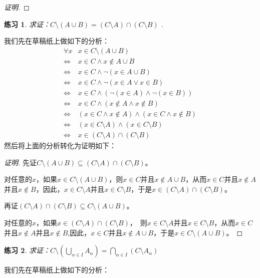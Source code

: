 \documentclass{book}[oneside]
\newtheorem{Exercise}{练习}[chapter]
\begin{document}
\begin{CJK*}{UTF8}{gbsn}
\begin{proof}[证明]
\end{proof}
\begin{Exercise}
  求证：$C\setminus (A \cup B) = (C \setminus A) \cap (C \setminus B)$ .
\end{Exercise}
我们先在草稿纸上做如下的分析：
\begin{equation*}
  \begin{split}
    \forall x &x \in C\setminus (A\cup B)\\
    \Leftrightarrow&x \in C \land x \notin A\cup B\\
    \Leftrightarrow&x \in C \land \lnot (x \in A\cup B)\\
    \Leftrightarrow&x \in C \land \lnot (x \in A \lor x \in B)\\
    \Leftrightarrow&x \in C \land (\lnot (x \in A) \land \lnot (x \in B))\\
    \Leftrightarrow&x \in C \land (x \notin A \land x \notin B)\\
    \Leftrightarrow&(x \in C \land x \notin A) \land (x \in C \land x \notin B)\\
    \Leftrightarrow&(x \in C \setminus A)\land (x \in C\setminus B)\\
    \Leftrightarrow&x \in (C\setminus A) \cap (C \setminus B)
  \end{split}
\end{equation*}
然后将上面的分析转化为证明如下：  
\begin{proof}[证明]
  先证$C\setminus (A\cup B)\subseteq (C\setminus A) \cap (C \setminus B)$。

  对任意的$x$，如果$x \in C\setminus (A\cup B)$，则$x \in C$并且$x \notin A\cup B$，从而$x \in C$并且$x\notin A$并且$x\notin B$，因此，$x\in C\setminus A$并且$x\in C\setminus B$，于是$x\in (C\setminus A) \cap (C \setminus B)$。

  再证$(C\setminus A) \cap (C \setminus B) \subseteq C\setminus (A\cup B)$。

  对任意的$x$，如果$x\in (C\setminus A) \cap (C \setminus B)$，　则$x\in C\setminus A$并且$x\in C\setminus B$，从而$x \in C$并且$x\notin A$并且$x\notin B$,因此，$x \in C$并且$x \notin A\cup B$，于是$x \in C\setminus (A\cup B)$。
\end{proof}

  \begin{Exercise}
    求证：$C\setminus(\bigcup_{\alpha \in I}A_{\alpha})=\bigcap_{\alpha\in I}(C\setminus A_{\alpha})$
  \end{Exercise}
  我们先在草稿纸上做如下的分析：


\end{CJK*}
\end{document}
